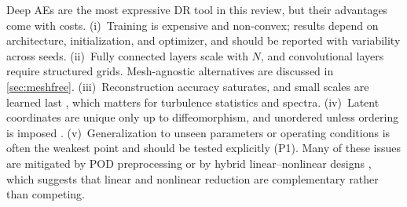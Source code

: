 Deep AEs are the most expressive DR tool in this review, but their advantages
come with costs. (i)~Training is expensive and non-convex; results depend on
architecture, initialization, and optimizer, and should be reported with
variability across seeds. (ii)~Fully connected layers scale with $N$, and
convolutional layers require structured grids. Mesh-agnostic alternatives are
discussed in \cref{sec:meshfree}. (iii)~Reconstruction accuracy saturates, and
small scales are learned last \parencite{rahaman2019spectral}, which matters for
turbulence statistics and spectra. (iv)~Latent coordinates are unique only up
to diffeomorphism, and unordered unless ordering is imposed
\parencite{fukami2020hierarchical,eivazi2022betavae}. (v)~Generalization to
unseen parameters or operating conditions is often the weakest point and
should be tested explicitly (P1). Many of these issues are mitigated by POD
preprocessing \parencite{fresca2022poddlrom} or by hybrid linear--nonlinear
designs \parencite{linot2020inertial}, which suggests that linear and nonlinear
reduction are complementary rather than competing.

